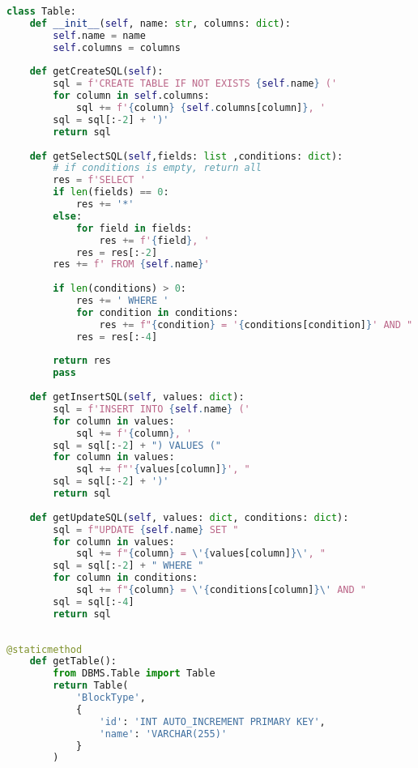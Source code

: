 \begin{lstlisting}[language=Python, caption={$\texttt{Table}$ class.}, label={lst:16}]
class Table:
    def __init__(self, name: str, columns: dict):
        self.name = name
        self.columns = columns
        
    def getCreateSQL(self):
        sql = f'CREATE TABLE IF NOT EXISTS {self.name} ('
        for column in self.columns:
            sql += f'{column} {self.columns[column]}, '
        sql = sql[:-2] + ')'
        return sql
    
    def getSelectSQL(self,fields: list ,conditions: dict):
        # if conditions is empty, return all
        res = f'SELECT '
        if len(fields) == 0:
            res += '*'
        else:
            for field in fields:
                res += f'{field}, '
            res = res[:-2]
        res += f' FROM {self.name}'
        
        if len(conditions) > 0:
            res += ' WHERE '
            for condition in conditions:
                res += f"{condition} = '{conditions[condition]}' AND "
            res = res[:-4]
            
        return res
        pass
    
    def getInsertSQL(self, values: dict):
        sql = f'INSERT INTO {self.name} ('
        for column in values:
            sql += f'{column}, '
        sql = sql[:-2] + ") VALUES ("
        for column in values:
            sql += f"'{values[column]}', "
        sql = sql[:-2] + ')'
        return sql
    
    def getUpdateSQL(self, values: dict, conditions: dict):
        sql = f"UPDATE {self.name} SET "
        for column in values:
            sql += f"{column} = \'{values[column]}\', "
        sql = sql[:-2] + " WHERE "
        for column in conditions:
            sql += f"{column} = \'{conditions[column]}\' AND "
        sql = sql[:-4]
        return sql
    
\end{lstlisting}

\begin{lstlisting}[language=Python, caption={$\texttt{getTable}$ function - BlockType class.}, label={lst:17}]
    @staticmethod
    def getTable():
        from DBMS.Table import Table
        return Table(
            'BlockType',
            {
                'id': 'INT AUTO_INCREMENT PRIMARY KEY',
                'name': 'VARCHAR(255)'
            }
        )
\end{lstlisting}


